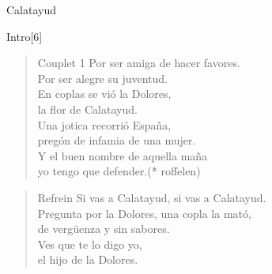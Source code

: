 \begin{song}{Calatayud}
\begin{instrumental}{Intro}[6]
\measure{}\measure{}\measure{}\measure{}\measure{}
\measure{}\measure{}\measure{}\measure{}\measure{}
\measure{}\measure{}\measure{}\measure{}\measure{}
\measure{}\measure{}\measure{}\measure{}
\end{instrumental}

\begin{verse}{Couplet 1}
Por ser amiga de hacer favores.\\
Por ser alegre su juventud.\hspace{0.5em}\hspace{0.5em}\\
En coplas se vió la Dolores,\\
la flor de Calatayud.\\
Una jotica recorrió España,\\
pregón de infamia de una mujer.\\
Y el buen nombre\hspace{0.5em}\hspace{0.5em} de aquella maña\\
yo tengo que defender.\hspace{3em}(* roffelen)\\
\end{verse}

\begin{verse}{Refrein}
Si vas a Calatayud, si vas a Calatayud.\\
Pregunta por la Dolores, una copla la mató,\\
de vergüenza y sin sabores.\\
\chord{}Ves que te lo digo yo,\\
el hijo de la Dolores.\chord{} \hspace{1.5em}\hspace{1.5em}\hspace{1.5em}\\
\end{verse}


\end{song}
